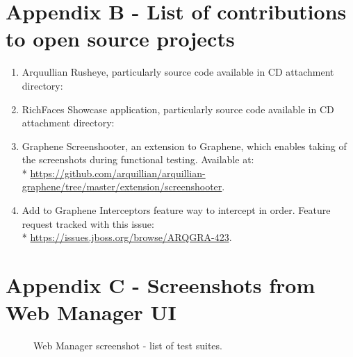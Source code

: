 \documentclass[11pt,oneside,final]{fithesis2}
\begin{document}
\chapter{Appendix B - List of contributions to open source projects}
\label{appendix:b}
\begin{enumerate}
 \item Arquullian Rusheye, particularly source code available in CD attachment directory:
 \item RichFaces Showcase application, particularly source code available in CD attachment directory:
 \item Graphene Screenshooter, an extension to Graphene, which enables taking of the screenshots during functional testing.
       Available at:\\* \url{https://github.com/arquillian/arquillian-graphene/tree/master/extension/screenshooter}.
 \item Add to Graphene Interceptors feature way to intercept in order. Feature request tracked with this issue:\\*
       \url{https://issues.jboss.org/browse/ARQGRA-423}.
\end{enumerate}


\chapter{Appendix C - Screenshots from Web Manager UI}
\label{appendix:c}
\begin{figure}[!htb]
    \begin{center}
    \leavevmode
    \centerline{}
    \end{center}
    \caption{Web Manager screenshot - list of test suites.}
    \label{fig:webManagerScreenTestSuiteList}
\end{figure}
\end{document}
